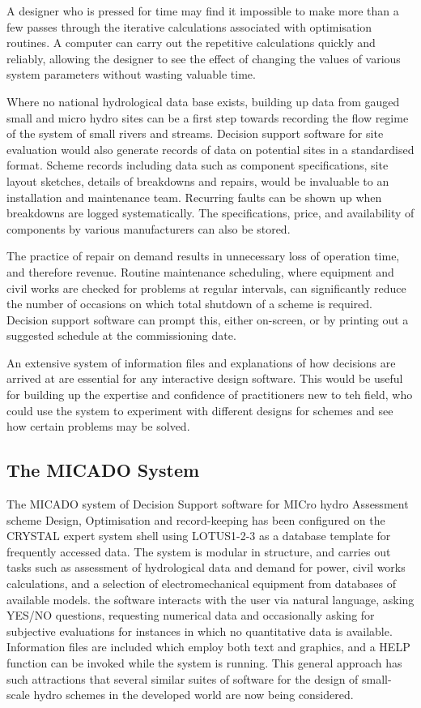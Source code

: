 A designer who is pressed for time may find it impossible to make more
than a few passes through the iterative calculations associated with
optimisation routines. A computer can carry out the repetitive
calculations quickly and reliably, allowing the designer to see the
effect of changing the values of various system parameters without
wasting valuable time.

Where no national hydrological data base exists, building up data from
gauged small and micro hydro sites can be a first step towards
recording the flow regime of the system of small rivers and streams.
Decision support software for site evaluation would also generate
records of data on potential sites in a standardised format. Scheme
records including data such as component specifications, site layout
sketches, details of breakdowns and repairs, would be invaluable to an
installation and maintenance team. Recurring faults can be shown up
when breakdowns are logged systematically. The specifications, price,
and availability of components by various manufacturers can also be
stored. 

The practice of repair on demand results in unnecessary loss of
operation time, and therefore revenue. Routine maintenance scheduling,
where equipment and civil works are checked for problems at regular
intervals, can significantly reduce the number of occasions on which
total shutdown of a scheme is required. Decision support software can
prompt this, either on-screen, or by printing out a suggested schedule
at the commissioning date.

An extensive system of information files and explanations of how
decisions are arrived at are essential for any interactive design
software. This would be useful for building up the expertise and
confidence of practitioners new to teh field, who could use the system
to experiment with different designs for schemes and see how certain
problems may be solved.

\subsection*{The MICADO System}
The MICADO system of Decision Support software for MICro hydro
Assessment scheme Design, Optimisation and record-keeping has been
configured on the CRYSTAL expert system shell using LOTUS1-2-3 as a
database template for frequently accessed data. The system is modular
in structure, and carries out tasks such as assessment of hydrological
data and demand for power, civil works calculations, and a selection
of electromechanical equipment from databases of available models. the
software interacts with the user via natural language, asking YES/NO
questions, requesting numerical data and occasionally asking for
subjective evaluations for instances in which no quantitative data is
available. Information files are included which employ both text and
graphics, and a HELP function can be invoked while the system is
running. This general approach has such attractions that several
similar suites of software for the design of small-scale hydro schemes
in the developed world are now being considered.

